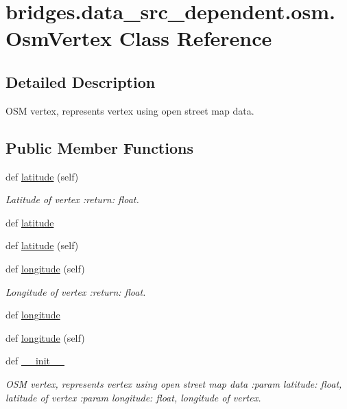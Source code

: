 \hypertarget{classbridges_1_1data__src__dependent_1_1osm_1_1_osm_vertex}{}\section{bridges.\+data\+\_\+src\+\_\+dependent.\+osm.\+Osm\+Vertex Class Reference}
\label{classbridges_1_1data__src__dependent_1_1osm_1_1_osm_vertex}


\subsection{Detailed Description}
O\+SM vertex, represents vertex using open street map data. \subsection*{Public Member Functions}
\begin{DoxyCompactItemize}
\item 
def \mbox{\hyperlink{classbridges_1_1data__src__dependent_1_1osm_1_1_osm_vertex_a31eefda235d8c4dd065ee5200897b473}{latitude}} (self)
\begin{DoxyCompactList}\small\item\em Latitude of vertex \+:return\+: float. \end{DoxyCompactList}\item 
def \mbox{\hyperlink{classbridges_1_1data__src__dependent_1_1osm_1_1_osm_vertex_add07a32c4c5e0f4af70d790cffa9a6d9}{latitude}}
\item 
def \mbox{\hyperlink{classbridges_1_1data__src__dependent_1_1osm_1_1_osm_vertex_a31eefda235d8c4dd065ee5200897b473}{latitude}} (self)
\item 
def \mbox{\hyperlink{classbridges_1_1data__src__dependent_1_1osm_1_1_osm_vertex_aca0aff0932e5436a0f72e53a93fe8f42}{longitude}} (self)
\begin{DoxyCompactList}\small\item\em Longitude of vertex \+:return\+: float. \end{DoxyCompactList}\item 
def \mbox{\hyperlink{classbridges_1_1data__src__dependent_1_1osm_1_1_osm_vertex_acf84d4c73cbffae355ec49c03b3f48c7}{longitude}}
\item 
def \mbox{\hyperlink{classbridges_1_1data__src__dependent_1_1osm_1_1_osm_vertex_aca0aff0932e5436a0f72e53a93fe8f42}{longitude}} (self)
\item 
def \mbox{\hyperlink{classbridges_1_1data__src__dependent_1_1osm_1_1_osm_vertex_a64fa8f3bfc7df74b5fa93bcc7326e6ac}{\+\_\+\+\_\+init\+\_\+\+\_\+}}
\begin{DoxyCompactList}\small\item\em O\+SM vertex, represents vertex using open street map data \+:param latitude\+: float, latitude of vertex \+:param longitude\+: float, longitude of vertex. \end{DoxyCompactList}\end{DoxyCompactItemize}
